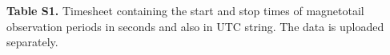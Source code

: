 \documentclass[draft,jgrga]{agutexSI2019}
\begin{document}
\begin{article}
\noindent\textbf{Table S1.} %
Timesheet containing the start and stop times of magnetotail observation periods in seconds and also in UTC string. The data is uploaded separately.


%
%






%  


%
%
\end{article}
\clearpage

\end{document}
